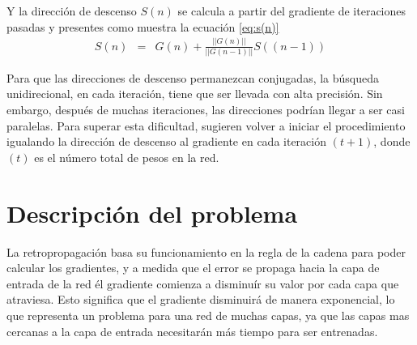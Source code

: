Y la dirección de descenso $S(n)$ se calcula a partir del gradiente de iteraciones pasadas y presentes como muestra la ecuación \ref{eq:s(n)}
\begin{eqnarray}
	S(n) &=& G(n) + \frac{||G(n)||}{||G(n - 1)||}S((n - 1))\label{eq:s(n)}
\end{eqnarray}

Para que las direcciones de descenso permanezcan conjugadas, la búsqueda unidirecional, en cada iteración, tiene que ser llevada con alta precisión. Sin embargo, después de muchas iteraciones, las direcciones podrían llegar a ser casi paralelas. Para superar esta dificultad,  sugieren volver a iniciar el procedimiento igualando la dirección de descenso al gradiente en cada iteración $(t + 1)$, donde $(t)$ es el número total de pesos en la red.


\section{Descripción del problema}
La retropropagación basa su funcionamiento en la regla de la cadena para poder calcular los gradientes, y a medida que el error se propaga hacia la capa de entrada de la red él gradiente comienza a disminuír su valor por cada capa que atraviesa. Esto significa que el gradiente disminuirá de manera exponencial, lo que representa un problema para una red de muchas capas, ya que las capas mas cercanas a la capa de entrada necesitarán más tiempo para ser entrenadas.

